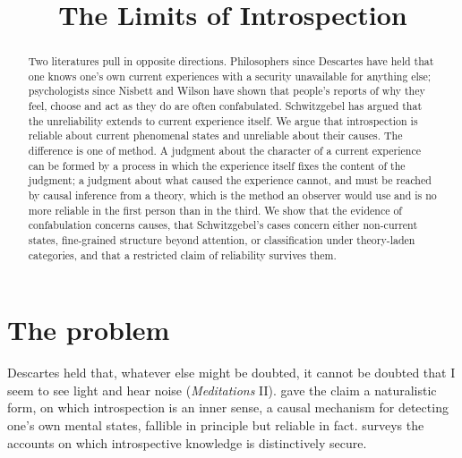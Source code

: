 \documentclass{situationist-preprint}
\title{The Limits of Introspection}
\begin{document}
\maketitle

\begin{abstract}
Two literatures pull in opposite directions. Philosophers since Descartes have held that one knows one's own current experiences with a security unavailable for anything else; psychologists since Nisbett and Wilson have shown that people's reports of why they feel, choose and act as they do are often confabulated. Schwitzgebel has argued that the unreliability extends to current experience itself. We argue that introspection is reliable about current phenomenal states and unreliable about their causes. The difference is one of method. A judgment about the character of a current experience can be formed by a process in which the experience itself fixes the content of the judgment; a judgment about what caused the experience cannot, and must be reached by causal inference from a theory, which is the method an observer would use and is no more reliable in the first person than in the third. We show that the evidence of confabulation concerns causes, that Schwitzgebel's cases concern either non-current states, fine-grained structure beyond attention, or classification under theory-laden categories, and that a restricted claim of reliability survives them.
\end{abstract}

\section{The problem}

Descartes held that, whatever else might be doubted, it cannot be doubted that I seem to see light and hear noise (\emph{Meditations} II). \citet{Armstrong1968} gave the claim a naturalistic form, on which introspection is an inner sense, a causal mechanism for detecting one's own mental states, fallible in principle but reliable in fact. \citet{Gertler2011} surveys the accounts on which introspective knowledge is distinctively secure.
\end{document}
